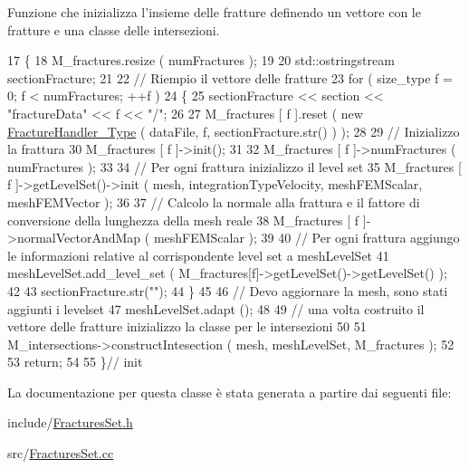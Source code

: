 Funzione che inizializza l'insieme delle fratture definendo un vettore con le fratture e una classe delle intersezioni. 


\begin{DoxyCode}
17 \{
18     M\_fractures.resize ( numFractures );
19 
20     std::ostringstream sectionFracture;
21 
22     \textcolor{comment}{// Riempio il vettore delle fratture}
23     \textcolor{keywordflow}{for} ( size\_type f = 0; f < numFractures; ++f )
24     \{
25             sectionFracture << section << \textcolor{stringliteral}{"fractureData"} << f << \textcolor{stringliteral}{"/"};
26 
27             M\_fractures [ f ].reset ( \textcolor{keyword}{new} \hyperlink{classFractureHandler}{FractureHandler\_Type} ( dataFile, f, 
      sectionFracture.str() ) );
28 
29             \textcolor{comment}{// Inizializzo la frattura  }
30             M\_fractures [ f ]->init();
31 
32             M\_fractures [ f ]->numFractures ( numFractures );
33 
34             \textcolor{comment}{// Per ogni frattura inizializzo il level set}
35             M\_fractures [ f ]->getLevelSet()->init ( mesh, integrationTypeVelocity, meshFEMScalar, 
      meshFEMVector );
36 
37             \textcolor{comment}{// Calcolo la normale alla frattura e il fattore di conversione della lunghezza della mesh
       reale}
38             M\_fractures [ f ]->normalVectorAndMap ( meshFEMScalar );
39 
40             \textcolor{comment}{// Per ogni frattura aggiungo le informazioni relative al corrispondente level set a
       meshLevelSet}
41             meshLevelSet.add\_level\_set ( M\_fractures[f]->getLevelSet()->getLevelSet() );
42 
43             sectionFracture.str(\textcolor{stringliteral}{""});
44     \}
45 
46     \textcolor{comment}{// Devo aggiornare la mesh, sono stati aggiunti i levelset}
47     meshLevelSet.adapt ();
48 
49     \textcolor{comment}{// una volta costruito il vettore delle fratture inizializzo la classe per le intersezioni}
50 
51     M\_intersections->constructIntesection ( mesh, meshLevelSet, M\_fractures );
52     
53     \textcolor{keywordflow}{return};
54 
55 \}\textcolor{comment}{// init}
\end{DoxyCode}


La documentazione per questa classe è stata generata a partire dai seguenti file\-:\begin{DoxyCompactItemize}
\item 
include/\hyperlink{FracturesSet_8h}{Fractures\-Set.\-h}\item 
src/\hyperlink{FracturesSet_8cc}{Fractures\-Set.\-cc}\end{DoxyCompactItemize}

